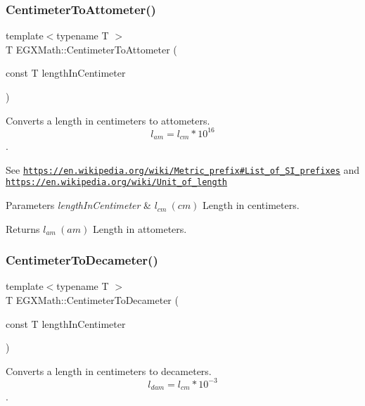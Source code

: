 \subsubsection{\texorpdfstring{Centimeter\+To\+Attometer()}{CentimeterToAttometer()}}
{\footnotesize\ttfamily template$<$typename T $>$ \\
T E\+G\+X\+Math\+::\+Centimeter\+To\+Attometer (\begin{DoxyParamCaption}\item[{const T}]{length\+In\+Centimeter }\end{DoxyParamCaption})}



Converts a length in centimeters to attometers. \[ l_{am}=l_{cm} * 10^{16} \]. 

See \href{https://en.wikipedia.org/wiki/Metric_prefix#List_of_SI_prefixes}{\tt https\+://en.\+wikipedia.\+org/wiki/\+Metric\+\_\+prefix\#\+List\+\_\+of\+\_\+\+S\+I\+\_\+prefixes} and \href{https://en.wikipedia.org/wiki/Unit_of_length}{\tt https\+://en.\+wikipedia.\+org/wiki/\+Unit\+\_\+of\+\_\+length} 
\begin{DoxyParams}{Parameters}
{\em length\+In\+Centimeter} & $ l_{cm}\ (cm)$ Length in centimeters. \\
\hline
\end{DoxyParams}
\begin{DoxyReturn}{Returns}
$ l_{am}\ (am)$ Length in attometers. 
\end{DoxyReturn}
\mbox{\label{group___e_g_x_math-_conversions-_length_conversions-_s_i-_centimeter-_s_i_ga5f40a749a8759a89e5c618df3c3b7945}} 
\subsubsection{\texorpdfstring{Centimeter\+To\+Decameter()}{CentimeterToDecameter()}}
{\footnotesize\ttfamily template$<$typename T $>$ \\
T E\+G\+X\+Math\+::\+Centimeter\+To\+Decameter (\begin{DoxyParamCaption}\item[{const T}]{length\+In\+Centimeter }\end{DoxyParamCaption})}



Converts a length in centimeters to decameters. \[ l_{dam}=l_{cm} * 10^{-3} \]. 


